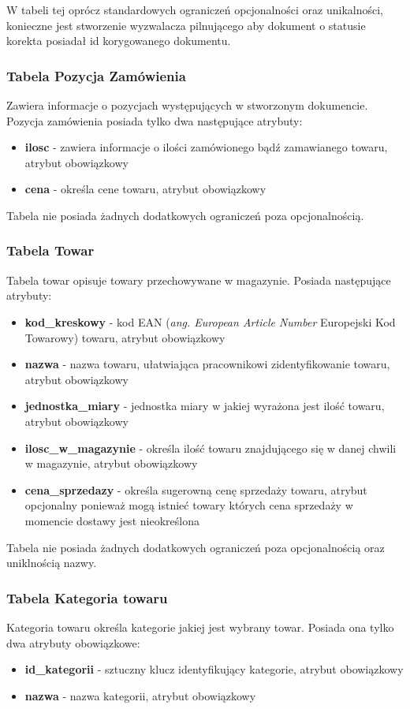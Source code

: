 W tabeli tej oprócz standardowych ograniczeń opcjonalności oraz unikalności,
konieczne jest stworzenie wyzwalacza pilnującego aby dokument o statusie korekta
posiadał id korygowanego dokumentu.

\subsubsection{Tabela Pozycja Zamówienia}
Zawiera informacje o pozycjach występujących w stworzonym dokumencie. Pozycja
zamówienia posiada tylko dwa następujące atrybuty:
\begin{itemize}
  \item \textbf{ilosc} - zawiera informacje o ilości zamówionego bądź
  zamawianego towaru, atrybut obowiązkowy
  \item \textbf{cena} - określa cene towaru, atrybut obowiązkowy
\end{itemize} 

Tabela nie posiada żadnych dodatkowych ograniczeń poza opcjonalnością.

\subsubsection{Tabela Towar}
Tabela towar opisuje towary przechowywane w magazynie. Posiada następujące
atrybuty:
\begin{itemize}
  \item \textbf{kod\_kreskowy} - kod EAN (\textit{ang. European Article
  Number} Europejski Kod Towarowy) towaru, atrybut obowiązkowy
  \item \textbf{nazwa} - nazwa towaru, ułatwiająca pracownikowi zidentyfikowanie
  towaru, atrybut obowiązkowy
  \item \textbf{jednostka\_miary} - jednostka miary w jakiej wyrażona jest ilość
  towaru, atrybut obowiązkowy
  \item \textbf{ilosc\_w\_magazynie} - określa ilość towaru znajdującego się w
  danej chwili w magazynie, atrybut obowiązkowy
  \item \textbf{cena\_sprzedazy} - określa sugerowną cenę sprzedaży towaru,
  atrybut opcjonalny ponieważ mogą istnieć towary których cena sprzedaży w
  momencie dostawy jest nieokreślona
\end{itemize}

Tabela nie posiada żadnych dodatkowych ograniczeń poza opcjonalnością oraz
uniklnością nazwy.

\subsubsection{Tabela Kategoria towaru}
Kategoria towaru określa kategorie jakiej jest wybrany towar. Posiada ona tylko
dwa atrybuty obowiązkowe:
\begin{itemize}
  \item \textbf{id\_kategorii} - sztuczny klucz identyfikujący kategorie,
  atrybut obowiązkowy
  \item \textbf{nazwa} - nazwa kategorii, atrybut obowiązkowy
\end{itemize}

